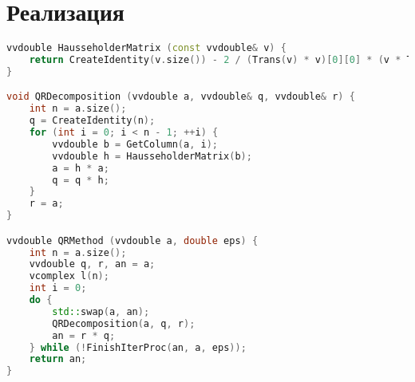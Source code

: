 \section*{Реализация}

\begin{lstlisting}[language=C++]
vvdouble HausseholderMatrix (const vvdouble& v) {
    return CreateIdentity(v.size()) - 2 / (Trans(v) * v)[0][0] * (v * Trans(v));
}

void QRDecomposition (vvdouble a, vvdouble& q, vvdouble& r) {
    int n = a.size();
    q = CreateIdentity(n);
    for (int i = 0; i < n - 1; ++i) {
        vvdouble b = GetColumn(a, i);
        vvdouble h = HausseholderMatrix(b);
        a = h * a;
        q = q * h;
    }
    r = a;
}

vvdouble QRMethod (vvdouble a, double eps) {
    int n = a.size();
    vvdouble q, r, an = a;
    vcomplex l(n);
    int i = 0;
    do {
        std::swap(a, an);
        QRDecomposition(a, q, r);
        an = r * q;
    } while (!FinishIterProc(an, a, eps));
    return an;
}
\end{lstlisting}

\pagebreak
